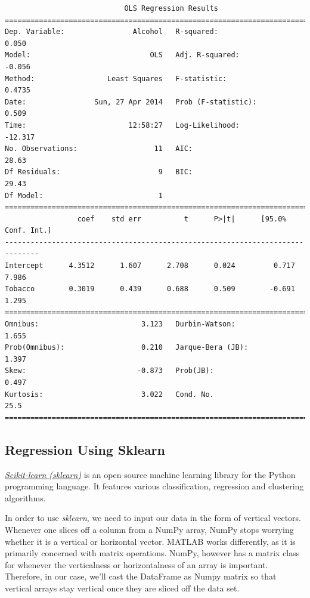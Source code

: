 \small
\begin{lstlisting}
                            OLS Regression Results
==============================================================================
Dep. Variable:                Alcohol   R-squared:                       0.050
Model:                            OLS   Adj. R-squared:                 -0.056
Method:                 Least Squares   F-statistic:                    0.4735
Date:                Sun, 27 Apr 2014   Prob (F-statistic):              0.509
Time:                        12:58:27   Log-Likelihood:                -12.317
No. Observations:                  11   AIC:                             28.63
Df Residuals:                       9   BIC:                             29.43
Df Model:                           1
==============================================================================
                 coef    std err          t      P>|t|      [95.0% Conf. Int.]
------------------------------------------------------------------------------
Intercept      4.3512      1.607      2.708      0.024         0.717     7.986
Tobacco        0.3019      0.439      0.688      0.509        -0.691     1.295
==============================================================================
Omnibus:                        3.123   Durbin-Watson:                   1.655
Prob(Omnibus):                  0.210   Jarque-Bera (JB):                1.397
Skew:                          -0.873   Prob(JB):                        0.497
Kurtosis:                       3.022   Cond. No.                         25.5
==============================================================================
\end{lstlisting}
\normalsize

\subsection{Regression Using Sklearn}

\href{http://scikit-learn.org/}{\emph{Scikit-learn (sklearn)}}  is an open source machine learning library for the Python programming language. It features various classification, regression and clustering algorithms.

In order to use \emph{sklearn}, we need to input our data in the form of vertical vectors. Whenever one slices off a column from a NumPy array, NumPy stops worrying whether it is a vertical or horizontal vector. MATLAB works differently, as it is primarily concerned with matrix operations. NumPy, however has a matrix class for whenever the verticalness or horizontalness of an array is important. Therefore, in our case, we’ll cast the DataFrame as Numpy matrix so that vertical arrays stay vertical once they are sliced off the data set.

